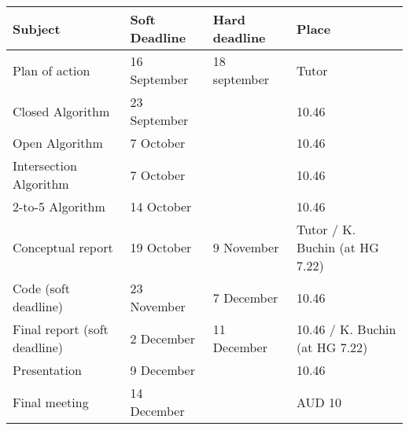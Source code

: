 \documentclass[a4paper]{article}
\begin{document}
  \begin{tabular}{|p{5cm}|p{3cm}|p{2.5cm}|p{4cm}|}
      \hline
      \textbf{Subject} & \textbf{Soft Deadline} & \textbf{Hard deadline} & \textbf{Place}\\
      \hline
      \hline
      Plan of action & 16 September & 18 september & Tutor\\
      \hline
      Closed Algorithm & 23 September& & 10.46\\
      \hline
      Open Algorithm & 7 October & & 10.46\\
      \hline
      Intersection Algorithm & 7 October& & 10.46\\
      \hline
      2-to-5 Algorithm & 14 October& & 10.46\\
      \hline
      Conceptual report & 19 October & 9 November& Tutor / K. Buchin (at HG 7.22) \\
      \hline
      Code (soft deadline) & 23 November & 7 December & 10.46\\
      \hline
      Final report (soft deadline) & 2 December & 11 December & 10.46 / K. Buchin (at HG 7.22)\\
      \hline
      Presentation & 9 December & &10.46\\
      \hline
      Final meeting & 14 December & & AUD 10\\
      \hline
  \end{tabular} \\ \\

\end{document}
